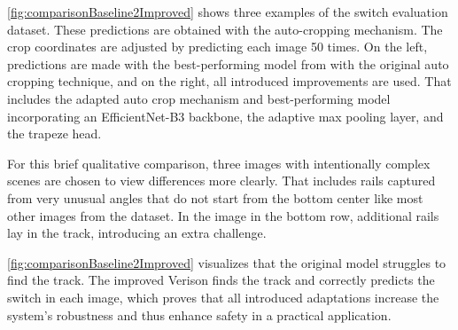 \autoref{fig:comparisonBaseline2Improved} shows three examples of the switch evaluation dataset.
These predictions are obtained with the auto-cropping mechanism.
The crop coordinates are adjusted by predicting each image 50 times.
On the left, predictions are made with the best-performing model from \cite{tepNet2024} with the original auto cropping technique, and on the right, all introduced improvements are used.
That includes the adapted auto crop mechanism and best-performing model incorporating an EfficientNet-B3 backbone, the adaptive max pooling layer, and the trapeze head.

For this brief qualitative comparison, three images with intentionally complex scenes are chosen to view differences more clearly.
That includes rails captured from very unusual angles that do not start from the bottom center like most other images from the dataset.
In the image in the bottom row, additional rails lay in the track, introducing an extra challenge.

\autoref{fig:comparisonBaseline2Improved} visualizes that the original model \cite{tepNet2024} struggles to find the track.
The improved Verison finds the track and correctly predicts the switch in each image, which proves that all introduced adaptations increase the system's robustness and thus enhance safety in a practical application.
